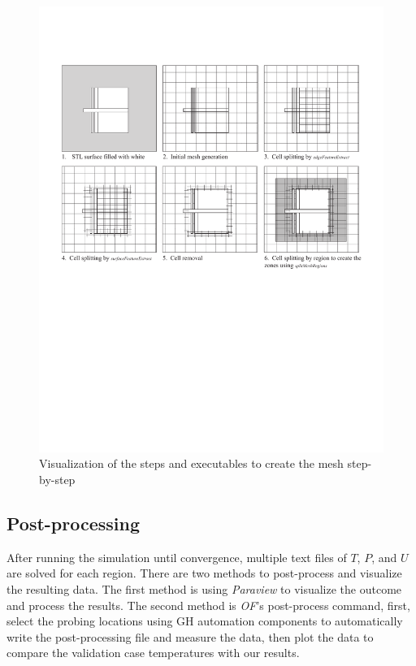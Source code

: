 \begin{figure}[htb]
     \centering
    \includegraphics[trim=1cm 11cm 1cm 3cm, clip, width=1\linewidth]{Figures/snappyhex.pdf}
     \caption[Mesh Creation Steps]{Visualization of the steps and executables to create the mesh step-by-step}
   \label{meshsteps}
 \end{figure}


\subsection{Post-processing}
After running the simulation until convergence, multiple text files of $T$, $P$, and $U$ are solved for each region. There are two methods to post-process and visualize the resulting data. The first method is using \textit{Paraview} to visualize the outcome and process the results. The second method is \textit{\gls{OF}}'s post-process command, first, select the probing locations using \gls{GH} automation components to automatically write the post-processing file and measure the data, then plot the data to compare the validation case temperatures with our results. 



